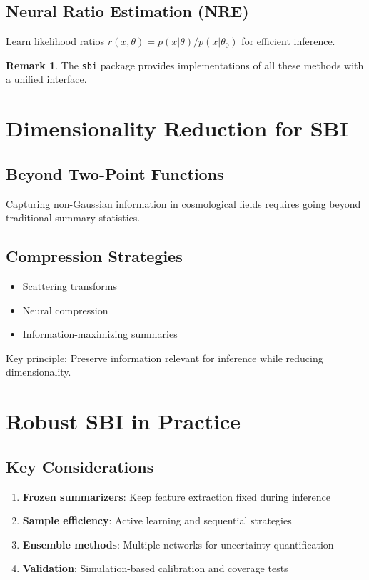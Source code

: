 \documentclass[11pt,a4paper]{article}
\theoremstyle{definition}
\newtheorem*{remark}{Remark}
\begin{document}
\subsection{Neural Ratio Estimation (NRE)}
Learn likelihood ratios $r(x,\theta) = p(x|\theta) / p(x|\theta_0)$ for efficient inference.

\begin{remark}
The \texttt{sbi} package provides implementations of all these methods with a unified interface.
\end{remark}

\section{Dimensionality Reduction for SBI}

\subsection{Beyond Two-Point Functions}
Capturing non-Gaussian information in cosmological fields requires going beyond traditional summary statistics.

\subsection{Compression Strategies}
\begin{itemize}
    \item Scattering transforms
    \item Neural compression
    \item Information-maximizing summaries
\end{itemize}

Key principle: Preserve information relevant for inference while reducing dimensionality.

\section{Robust SBI in Practice}

\subsection{Key Considerations}
\begin{enumerate}
    \item \textbf{Frozen summarizers}: Keep feature extraction fixed during inference
    \item \textbf{Sample efficiency}: Active learning and sequential strategies
    \item \textbf{Ensemble methods}: Multiple networks for uncertainty quantification
    \item \textbf{Validation}: Simulation-based calibration and coverage tests
\end{enumerate}
\end{document}

